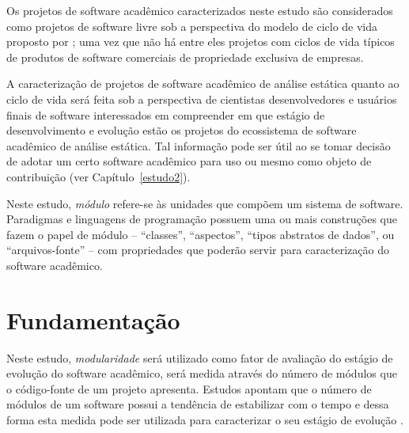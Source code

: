 Os projetos de software acadêmico caracterizados neste estudo são considerados
como projetos de software livre sob a perspectiva do modelo de ciclo de vida proposto por
; uma vez que não há entre eles projetos com
ciclos de vida típicos de produtos de software comerciais de propriedade exclusiva de empresas.


A caracterização de projetos de software acadêmico de análise estática quanto
ao ciclo de vida será feita sob a perspectiva de cientistas desenvolvedores e
usuários finais de software interessados em compreender em que estágio de
desenvolvimento e evolução estão os projetos do ecossistema de software
acadêmico de análise estática. Tal informação pode ser 
útil ao se tomar decisão de adotar um certo software acadêmico para uso ou mesmo como
objeto de contribuição (ver Capítulo~\ref{estudo2}).

Neste estudo, \textit{módulo} refere-se \`{a}s unidades que compõem um sistema de software.  
Paradigmas e linguagens de programação possuem uma ou mais
construções que fazem o papel de módulo -- ``classes'', ``aspectos'', ``tipos
abstratos de dados'', ou ``arquivos-fonte'' -- com propriedades que poderão
servir para caracterização do software acadêmico.


\section{Fundamentação} \label{estudo3:fundamentacao}

Neste estudo, {\it modularidade} será utilizado como fator de avaliação do
estágio de evolução do software acadêmico, será medida através do número de
módulos que o código-fonte de um projeto apresenta. Estudos apontam que o
número de módulos de um software possui a tendência de estabilizar com o tempo
e dessa forma esta medida pode ser utilizada para caracterizar o seu estágio de
evolução \cite{capiluppi2007adapting}.

%
%


